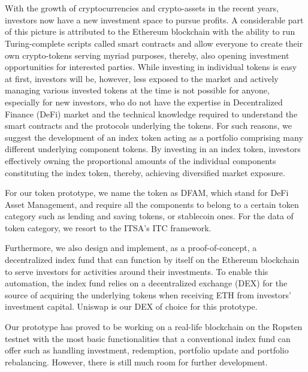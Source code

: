 \chapter{\abstractname}




With the growth of cryptocurrencies and crypto-assets in the recent years, investors now have a new investment space to pursue profits. A considerable part of this picture is attributed to the Ethereum blockchain with the ability to run Turing-complete scripts called smart contracts and allow everyone to create their own crypto-tokens serving myriad purposes, thereby, also opening investment opportunities for interested parties. While investing in individual tokens is easy at first, investors will be, however, less exposed to the market and actively managing various invested tokens at the time is not possible for anyone, especially for new investors, who do not have the expertise in Decentralized Finance (DeFi) market and the technical knowledge required to understand the smart contracts and the protocols underlying the tokens. For such reasons, we suggest the development of an index token acting as a portfolio comprising many different underlying component tokens. By investing in an index token, investors effectively owning the proportional amounts of the individual components constituting the index token, thereby, achieving diversified market exposure.

For our token prototype, we name the token as DFAM, which stand for DeFi Asset Management, and require all the components to belong to a certain token category such as lending and saving tokens, or stablecoin ones. For the data of token category, we resort to the ITSA's ITC framework.

Furthermore, we also design and implement, as a proof-of-concept, a decentralized index fund that can function by itself on the Ethereum blockchain to serve investors for activities around their investments. To enable this automation, the index fund relies on a decentralized exchange (DEX) for the source of acquiring the underlying tokens when receiving ETH from investors' investment capital. Uniswap is our DEX of choice for this prototype.

Our prototype has proved to be working on a real-life blockchain on the Ropsten testnet with the most basic functionalities that a conventional index fund can offer such as handling investment, redemption, portfolio update and portfolio rebalancing. However, there is still much room for further development. 








